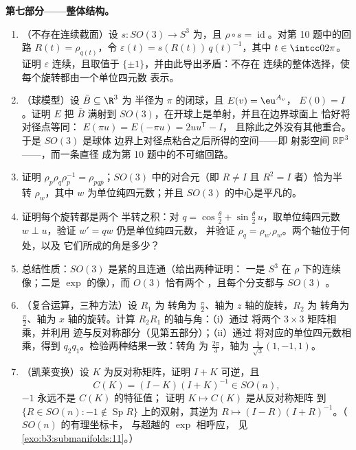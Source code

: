 \begin{problem}
\medskip
\noindent\textbf{第七部分——整体结构。}
\begin{enumerate}[resume]
  \item （不存在连续截面）设 $s \colon SO(3) \to
        S^3$ 为，且 $\rho \circ s =
        \operatorname{id}$。对第 10 题中的回路 $R(t) =
        \rho_{q(t)}$，令 $\varepsilon(t) =
        s(R(t))\,q(t)^{-1}$，其中 $t \in \intcc0{2\pi}$。证明
        $\varepsilon$ 连续，且取值于
        $\{\pm1\}$，并由此导出矛盾：不存在
        连续的整体选择，使每个旋转都由一个单位四元数
        表示。
  \item （球模型）设 $\bar B \subseteq \R^3$ 为
        半径为 $\pi$ 的闭球，且 $E(v) = \eu^{A_v}$，
        $E(0) = I$。证明 $E$ 把 $\bar B$ 满射到
        $SO(3)$，在开球上是单射，并且在边界球面上
        恰好将对径点等同：
        $E(\pi u) = E(-\pi u) = 2uu^{\mathsf T} - I$，
        且除此之外没有其他重合。于是 $SO(3)$ 是球体
        边界上对径点粘合之后所得的空间——即
        射影空间 $\mathbb{RP}^3$——，而一条直径
        成为第 10 题中的不可缩回路。
  \item 证明 $\rho_p\rho_q\rho_p^{-1} = \rho_{pq\bar
        p}$；$SO(3)$ 中的对合元（即 $R \neq
        I$ 且 $R^2 = I$ 者）恰为半转
        $\rho_w$，其中 $w$ 为单位纯四元数；并且
        $SO(3)$ 的中心是平凡的。
  \item 证明每个旋转都是两个
        半转之积：对 $q = \cos\frac\theta2 +
        \sin\frac\theta2\,u$，取单位纯四元数 $w \perp
        u$，验证 $w' = qw$ 仍是单位纯四元数，
        并验证 $\rho_q =
        \rho_{w'}\rho_w$。两个轴位于何处，以及
        它们所成的角是多少？
  \item 总结性质：$SO(3)$
        是紧的且连通（给出两种证明：
        一是 $S^3$ 在 $\rho$ 下的连续像；二是
        $\exp$ 的像），而 $O(3)$ 恰有两个
        ，且每个分支都与 $SO(3)$ 。

  \item （复合运算，三种方法）设 $R_1$ 为
        转角为 $\frac\pi2$、轴为 $z$ 轴的旋转，$R_2$ 为
        转角为 $\frac\pi2$、轴为 $x$ 轴的旋转。计算
        $R_2R_1$ 的轴与角：（i）通过
        将两个 $3\times3$ 矩阵相乘，并利用
        迹与反对称部分（见第五部分）；（ii）通过
        将对应的单位四元数相乘，得到
        $q_2q_1$。检验两种结果一致：转角
        为 $\frac{2\pi}3$，轴为 $\frac1{\sqrt3}(1, -1, 1)$。
  \item （凯莱变换）设 $K$ 为反对称矩阵，证明
        $I + K$ 可逆，且
        \[
        C(K) = (I - K)(I + K)^{-1} \in SO(n),
        \]
        $-1$ 永远不是 $C(K)$ 的特征值；
        证明 $K \mapsto C(K)$ 是从反对称矩阵
        到 $\{R \in SO(n) : -1 \notin
        \operatorname{Sp}R\}$ 上的双射，其逆为 $R \mapsto (I -
        R)(I + R)^{-1}$。（$SO(n)$ 的有理坐标卡，
        与超越的 $\exp$ 相呼应，
        见\cref{exo:b3:submanifolds:11}。）
\end{enumerate}
\end{problem}
